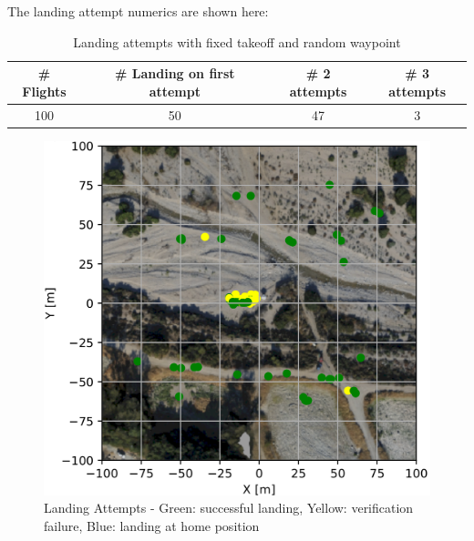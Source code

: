     The landing attempt numerics are shown here:
    \begin{table}[h]
        \begin{center}
         \caption{Landing attempts with fixed takeoff and random waypoint}\vspace{1ex}
         \label{tab:land_nums_random_waypoint}
         \begin{tabular}{|c|c|c|c|}
         \hline
         \# Flights & \# Landing on first attempt & \# 2 attempts & \# 3 attempts\\ \hline \hline
         100 & 50 & 47 & 3 \\%
         \hline
         \end{tabular}
        \end{center}
    \end{table}

    \begin{figure}[h]
        \begin{center}
            \includegraphics[scale=0.25]{images/evaluation/landings_random_WP_GT.png}
            \caption{Landing Attempts - Green: successful landing, Yellow: verification failure, Blue: landing at home position}
            \label{fig:landing_attempts_random_WP}
        \end{center}
    \end{figure}%

